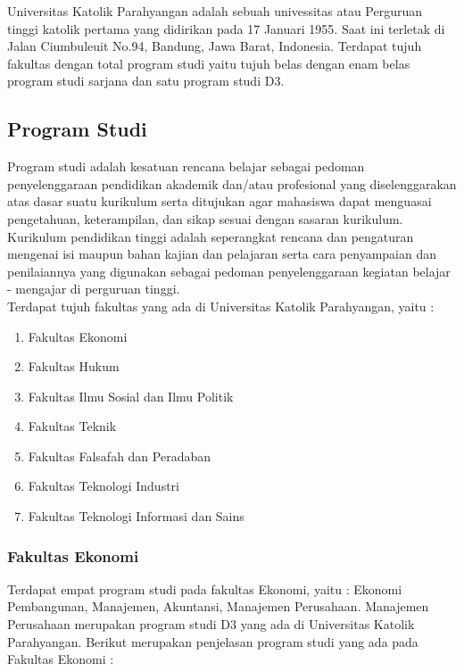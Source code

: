 Universitas Katolik Parahyangan adalah sebuah univessitas atau Perguruan tinggi katolik pertama yang didirikan pada 17 Januari 1955. Saat ini terletak di Jalan Ciumbuleuit No.94, Bandung, Jawa Barat, Indonesia. Terdapat tujuh fakultas dengan total program studi yaitu tujuh belas dengan enam belas program studi sarjana dan satu program studi D3. %

\subsection{Program Studi}
\label{sec:program studi} 
Program studi adalah kesatuan rencana belajar sebagai pedoman penyelenggaraan pendidikan akademik dan/atau profesional yang diselenggarakan atas dasar suatu kurikulum serta ditujukan agar mahasiswa dapat menguasai pengetahuan, keterampilan, dan sikap sesuai dengan sasaran kurikulum. Kurikulum pendidikan tinggi adalah seperangkat rencana dan pengaturan mengenai isi maupun bahan kajian dan pelajaran serta cara penyampaian dan penilaiannya yang digunakan sebagai pedoman penyelenggaraan kegiatan belajar - mengajar di perguruan tinggi. \\ %

Terdapat tujuh fakultas yang ada di Universitas Katolik Parahyangan, yaitu :
	\begin{enumerate}
		\item Fakultas Ekonomi 
		\item Fakultas Hukum
		\item Fakultas Ilmu Sosial dan Ilmu Politik
		\item Fakultas Teknik
		\item Fakultas Falsafah dan Peradaban
		\item Fakultas Teknologi Industri
		\item Fakultas Teknologi Informasi dan Sains
	\end{enumerate}\leavevmode
	
\subsubsection{Fakultas Ekonomi}
Terdapat empat program studi pada fakultas Ekonomi, yaitu : Ekonomi Pembangunan, Manajemen, Akuntansi, Manajemen Perusahaan. Manajemen Perusahaan merupakan program studi D3 yang ada di Universitas Katolik Parahyangan. Berikut merupakan penjelasan program studi yang ada pada Fakultas Ekonomi :
	
